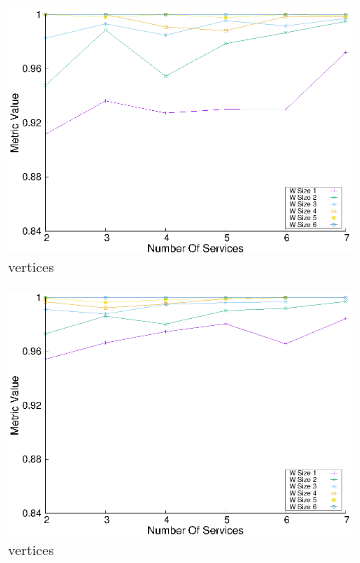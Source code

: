 \begin{figure}[H]
\begin{subfigure}{0.45\textwidth}
    \includegraphics[width=\textwidth]{Images/graphs/window_quality_performance_diff_qual_n7_s7_20_100_n6}
    \caption{ vertices}
    \label{fig:quality_window_wide_qualitative_n6}
  \end{subfigure}
  \hfill
  \begin{subfigure}{0.45\textwidth}
    \includegraphics[width=\textwidth]{Images/graphs/window_quality_performance_diff_qual_n7_s7_50_80_n6}
    \caption{ vertices}
    \label{fig:quality_window_average_qualitative_n6}
  \end{subfigure}
  \hfill
  \begin{subfigure}{0.45\textwidth}

\end{subfigure}
\end{figure}
